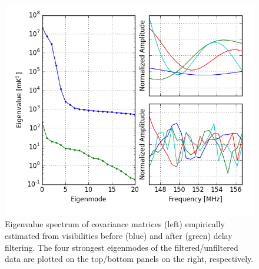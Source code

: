\documentclass[twocolumn,numberedappendix]{emulateapj} \shorttitle{New Limits on the 21 cm Power Spectrum at $z=8.4$}
\begin{document}
\begin{figure}\centering
\includegraphics[width=\columnwidth]{plots/eig.png}
\caption{
Eigenvalue spectrum of covariance matrices (left) empirically estimated 
from visibilities before (blue) and after (green) delay filtering.
The four strongest eigenmodes of the filtered/unfiltered data are plotted
on the top/bottom panels on the right, respectively.
} \label{fig:eigs}
\end{figure}
\end{document}
